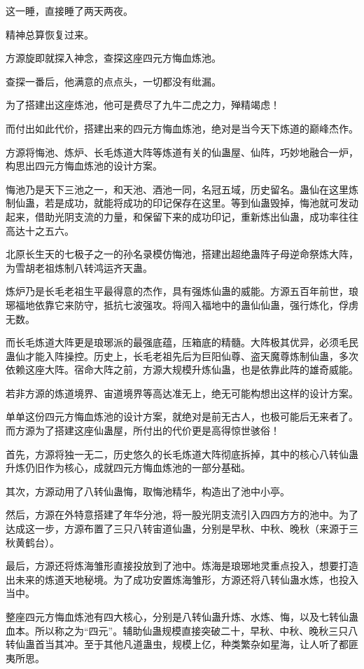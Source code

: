 \begin{this_body}
这一睡，直接睡了两天两夜。

精神总算恢复过来。

方源旋即就探入神念，查探这座四元方悔血炼池。

查探一番后，他满意的点点头，一切都没有纰漏。

为了搭建出这座炼池，他可是费尽了九牛二虎之力，殚精竭虑！

而付出如此代价，搭建出来的四元方悔血炼池，绝对是当今天下炼道的巅峰杰作。

方源将悔池、炼炉、长毛炼道大阵等炼道有关的仙蛊屋、仙阵，巧妙地融合一炉，构思出四元方悔血炼池的设计方案。

悔池乃是天下三池之一，和天池、酒池一同，名冠五域，历史留名。蛊仙在这里炼制仙蛊，若是成功，就能将成功的印记保存在这里。等到仙蛊毁掉，悔池就可发动起来，借助光阴支流的力量，和保留下来的成功印记，重新炼出仙蛊，成功率往往高达十之五六。

北原长生天的七极子之一的孙名录模仿悔池，搭建出超绝蛊阵子母逆命祭炼大阵，为雪胡老祖炼制八转鸿运齐天蛊。

炼炉乃是长毛老祖生平最得意的杰作，具有强炼仙蛊的威能。方源五百年前世，琅琊福地依靠它来防守，抵抗七波强攻。将闯入福地中的蛊仙仙蛊，强行炼化，俘虏无数。

而长毛炼道大阵更是琅琊派的最强底蕴，压箱底的精髓。大阵极其优异，必须毛民蛊仙才能入阵操控。历史上，长毛老祖先后为巨阳仙尊、盗天魔尊炼制仙蛊，多次依赖这座大阵。宿命大阵之前，方源大规模升炼仙蛊，也是依靠此阵的雄奇威能。

若非方源的炼道境界、宙道境界等高达准无上，绝无可能构想出这样的设计方案。

单单这份四元方悔血炼池的设计方案，就绝对是前无古人，也极可能后无来者了。而方源为了搭建这座仙蛊屋，所付出的代价更是高得惊世骇俗！

首先，方源将独一无二，历史悠久的长毛炼道大阵彻底拆掉，其中的核心八转仙蛊升炼仍旧作为核心，成就四元方悔血炼池的一部分基础。

其次，方源动用了八转仙蛊悔，取悔池精华，构造出了池中小亭。

然后，方源在外特意搭建了年华分池，将一股光阴支流引入四四方方的池中。为了达成这一步，方源布置了三只八转宙道仙蛊，分别是早秋、中秋、晚秋（来源于三秋黄鹤台）。

最后，方源还将炼海雏形直接投放到了池中。炼海是琅琊地灵重点投入，想要打造出未来的炼道天地秘境。为了成功安置炼海雏形，方源还将八转仙蛊水炼，也投入当中。

整座四元方悔血炼池有四大核心，分别是八转仙蛊升炼、水炼、悔，以及七转仙蛊血本。所以称之为“四元”。辅助仙蛊规模直接突破二十，早秋、中秋、晚秋三只八转仙蛊首当其冲。至于其他凡道蛊虫，规模上亿，种类繁杂如星海，让人听了都匪夷所思。


\end{this_body}

